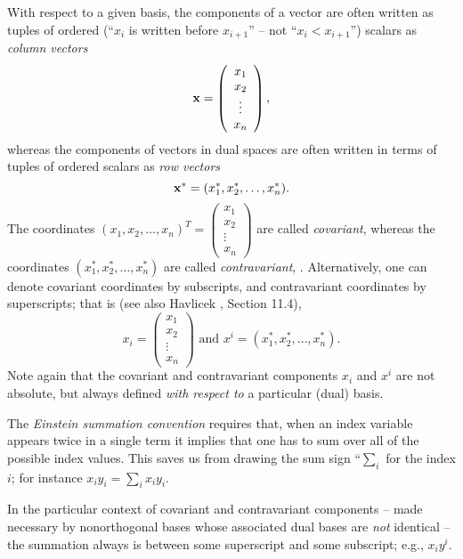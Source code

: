 With respect to a given basis,
the components of a vector are often written as tuples of ordered
(``$x_i$ is written before $x_{i+1}$'' -- not ``$x_i < x_{i+1}$'')
scalars  as {\em column vectors}
\begin{equation}
{\bf x}= \left(
\begin{array}{c}
x_1\\x_2\\
\vdots \\ x_n
\end{array}
\right),
\end{equation}
whereas the components of vectors in dual spaces are often written in terms of
 tuples of ordered
scalars  as {\em row vectors}
\begin{equation}
{\bf x}^*= (x_1^*,x_2^*,\ldots , x_n^*)
.
\end{equation}
The coordinates  $(x_1,x_2,\ldots , x_n)^T=\left(
\begin{array}{c}
x_1\\x_2\\
\vdots \\ x_n
\end{array}
\right)$
are called
{\em covariant},
whereas the coordinates  $(x_1^*,x_2^*,\ldots , x_n^*)$
are called
{\em contravariant},
.
Alternatively, one can denote
covariant coordinates by subscripts,
and contravariant coordinates by superscripts; that is
(see also
Havlicek \cite{havlicek-laftm}, Section 11.4),
\begin{equation}
x_i =  \left(
\begin{array}{c}
x_1\\x_2\\
\vdots \\ x_n
\end{array}
\right)
\textrm{ and }
 x^i =
(x_1^*,x_2^*,\ldots , x_n^* ).
\end{equation}
Note again that the covariant and contravariant components
$x_i$ and $x^i$ are not absolute, but always defined {\em with respect to}
a particular (dual) basis.

The {\em Einstein summation convention}
requires that, when an index variable appears twice in a single term it implies that one has to
sum over all of the possible index values.
This saves us from drawing the sum sign ``$\sum_i$ for the index $i$;
for instance $x_iy_i =\sum_{i}x_iy_i$.

In the particular context of covariant and contravariant components
--
made necessary by nonorthogonal bases whose associated dual bases are {\em not} identical
--
the summation always is between some superscript and some subscript;
e.g., $x_iy^i$.

